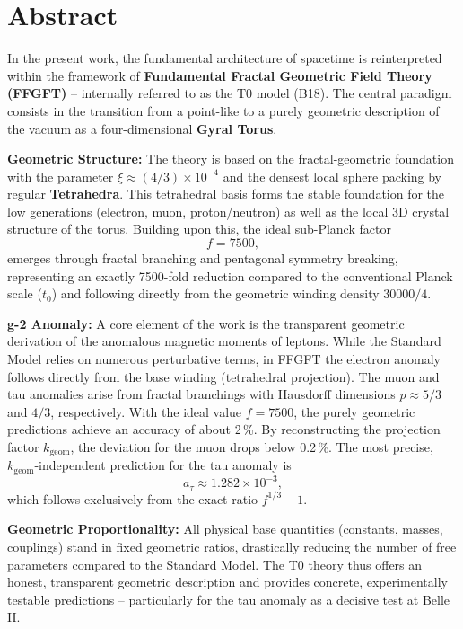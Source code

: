 \section*{Abstract}
		In the present work, the fundamental architecture of spacetime is reinterpreted within the framework of \textbf{Fundamental Fractal Geometric Field Theory (FFGFT)} – internally referred to as the T0 model (B18). The central paradigm consists in the transition from a point-like to a purely geometric description of the vacuum as a four-dimensional \textbf{Gyral Torus}.
		
		\textbf{Geometric Structure:} The theory is based on the fractal-geometric foundation with the parameter $\xi \approx (4/3)\times 10^{-4}$ and the densest local sphere packing by regular \textbf{Tetrahedra}. This tetrahedral basis forms the stable foundation for the low generations (electron, muon, proton/neutron) as well as the local 3D crystal structure of the torus. Building upon this, the ideal sub-Planck factor
		\begin{equation*}
			f = 7500,
		\end{equation*}
		emerges through fractal branching and pentagonal symmetry breaking, representing an exactly 7500-fold reduction compared to the conventional Planck scale ($t_0$) and following directly from the geometric winding density $30000/4$.
		
		\textbf{g-2 Anomaly:} A core element of the work is the transparent geometric derivation of the anomalous magnetic moments of leptons. While the Standard Model relies on numerous perturbative terms, in FFGFT the electron anomaly follows directly from the base winding (tetrahedral projection). The muon and tau anomalies arise from fractal branchings with Hausdorff dimensions $p \approx 5/3$ and $4/3$, respectively. With the ideal value $f = 7500$, the purely geometric predictions achieve an accuracy of about 2\,\%. By reconstructing the projection factor $k_\text{geom}$, the deviation for the muon drops below 0.2\,\%. The most precise, $k_\text{geom}$-independent prediction for the tau anomaly is
		\begin{equation*}
			a_\tau \approx 1.282 \times 10^{-3},
		\end{equation*}
		which follows exclusively from the exact ratio $f^{1/3} - 1$.
		
		\textbf{Geometric Proportionality:} All physical base quantities (constants, masses, couplings) stand in fixed geometric ratios, drastically reducing the number of free parameters compared to the Standard Model. The T0 theory thus offers an honest, transparent geometric description and provides concrete, experimentally testable predictions – particularly for the tau anomaly as a decisive test at Belle II.

